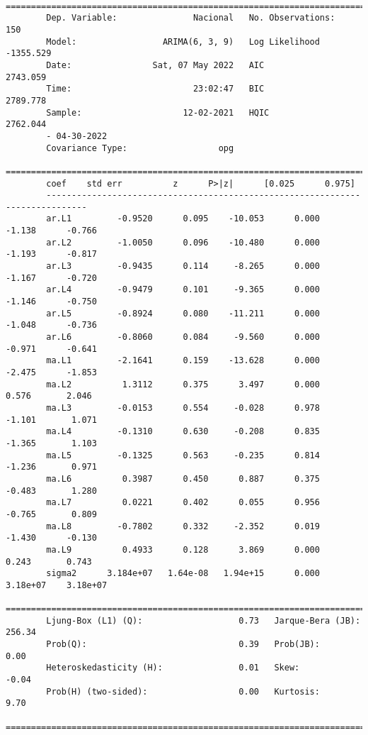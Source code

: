 \documentclass[11pt,letterpaper]{article}
\theoremstyle{definition}
\theoremstyle{theorem}
\theoremstyle{remark}
\begin{document}
	\begin{verbatim}
		==============================================================================
		Dep. Variable:               Nacional   No. Observations:                  150
		Model:                 ARIMA(6, 3, 9)   Log Likelihood               -1355.529
		Date:                Sat, 07 May 2022   AIC                           2743.059
		Time:                        23:02:47   BIC                           2789.778
		Sample:                    12-02-2021   HQIC                          2762.044
		- 04-30-2022
		Covariance Type:                  opg
		==============================================================================
		coef    std err          z      P>|z|      [0.025      0.975]
		------------------------------------------------------------------------------
		ar.L1         -0.9520      0.095    -10.053      0.000      -1.138      -0.766
		ar.L2         -1.0050      0.096    -10.480      0.000      -1.193      -0.817
		ar.L3         -0.9435      0.114     -8.265      0.000      -1.167      -0.720
		ar.L4         -0.9479      0.101     -9.365      0.000      -1.146      -0.750
		ar.L5         -0.8924      0.080    -11.211      0.000      -1.048      -0.736
		ar.L6         -0.8060      0.084     -9.560      0.000      -0.971      -0.641
		ma.L1         -2.1641      0.159    -13.628      0.000      -2.475      -1.853
		ma.L2          1.3112      0.375      3.497      0.000       0.576       2.046
		ma.L3         -0.0153      0.554     -0.028      0.978      -1.101       1.071
		ma.L4         -0.1310      0.630     -0.208      0.835      -1.365       1.103
		ma.L5         -0.1325      0.563     -0.235      0.814      -1.236       0.971
		ma.L6          0.3987      0.450      0.887      0.375      -0.483       1.280
		ma.L7          0.0221      0.402      0.055      0.956      -0.765       0.809
		ma.L8         -0.7802      0.332     -2.352      0.019      -1.430      -0.130
		ma.L9          0.4933      0.128      3.869      0.000       0.243       0.743
		sigma2      3.184e+07   1.64e-08   1.94e+15      0.000    3.18e+07    3.18e+07
		===================================================================================
		Ljung-Box (L1) (Q):                   0.73   Jarque-Bera (JB):               256.34
		Prob(Q):                              0.39   Prob(JB):                         0.00
		Heteroskedasticity (H):               0.01   Skew:                            -0.04
		Prob(H) (two-sided):                  0.00   Kurtosis:                         9.70
		===================================================================================\end{verbatim}
\end{document}
